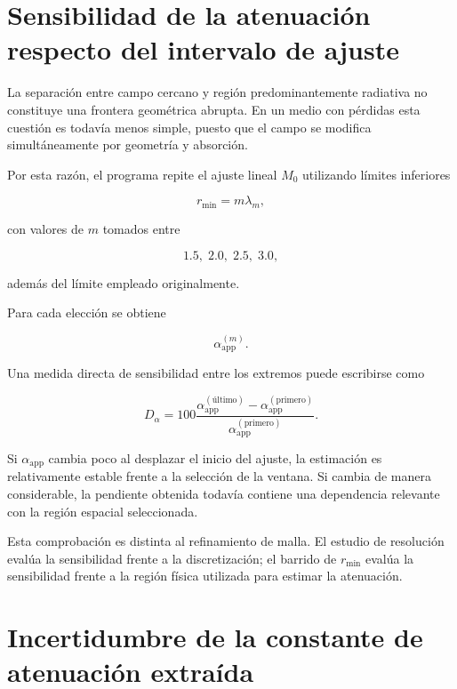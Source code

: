 \section{Sensibilidad de la atenuación respecto del intervalo de ajuste}

La separación entre campo cercano y región predominantemente radiativa no constituye una frontera geométrica abrupta. En un medio con pérdidas esta cuestión es todavía menos simple, puesto que el campo se modifica simultáneamente por geometría y absorción.

Por esta razón, el programa repite el ajuste lineal $M_0$ utilizando límites inferiores

\begin{equation}
r_{\min}
=
m\lambda_m,
\end{equation}

con valores de $m$ tomados entre

\begin{equation}
1.5,\;2.0,\;2.5,\;3.0,
\end{equation}

además del límite empleado originalmente.

Para cada elección se obtiene

\begin{equation}
\alpha_{\mathrm{app}}^{(m)}.
\end{equation}

Una medida directa de sensibilidad entre los extremos puede escribirse como

\begin{equation}
D_\alpha
=
100
\frac{
\alpha_{\mathrm{app}}^{(\text{último})}
-
\alpha_{\mathrm{app}}^{(\mathrm{primero})}
}{
\alpha_{\mathrm{app}}^{(\mathrm{primero})}
}.
\label{eq:deriva_alpha}
\end{equation}

Si $\alpha_{\mathrm{app}}$ cambia poco al desplazar el inicio del ajuste, la estimación es relativamente estable frente a la selección de la ventana. Si cambia de manera considerable, la pendiente obtenida todavía contiene una dependencia relevante con la región espacial seleccionada.

Esta comprobación es distinta al refinamiento de malla. El estudio de resolución evalúa la sensibilidad frente a la discretización; el barrido de $r_{\min}$ evalúa la sensibilidad frente a la región física utilizada para estimar la atenuación.

\section{Incertidumbre de la constante de atenuación extraída}

